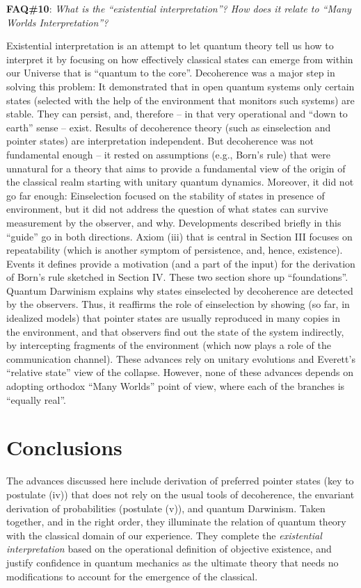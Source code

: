 \documentclass[aps,amsmath,amssymb,amsfonts,floatfix]{revtex4-1}
\newcommand{\+}         {\dagger}
\begin{document}
{{{{\bf FAQ\#10}: {\it What is the ``existential interpretation''? How does it relate to ``Many Worlds Interpretation''?}

Existential interpretation is an attempt to let quantum theory tell us how to interpret it by focusing on how effectively classical states can emerge from within our Universe that is ``quantum to the core''. Decoherence was a major step in solving this problem: It demonstrated that in open quantum systems only certain states (selected with the help of the environment that monitors such systems) are stable. They can persist, and, therefore -- in that very operational and ``down to earth'' sense -- exist. Results of decoherence theory (such as einselection and pointer states) are interpretation independent. But decoherence was not fundamental enough -- it rested on assumptions (e.g., Born's rule) that were unnatural for a theory that aims to provide a fundamental view of the origin of the classical realm starting with unitary quantum dynamics. Moreover, it did not go far enough: Einselection focused on the stability of states in presence of environment, but it did not address the question of what states can survive measurement by the observer, and why. Developments described briefly in this ``guide''  go in both directions. Axiom (iii) that is central in Section III focuses on repeatability (which is another symptom of persistence, and, hence, existence). Events it defines provide a motivation (and a part of the input) for the derivation of Born's rule sketched in Section IV. These two section shore up ``foundations''. Quantum Darwinism explains why states einselected by decoherence are detected by the observers. Thus, it reaffirms the role of einselection by showing (so far, in idealized models) that pointer states are usually reproduced in many copies in the environment, and that observers find out the state of the system indirectly, by intercepting fragments of the environment (which now plays a role of the communication channel). These advances rely on unitary evolutions and Everett's ``relative state'' view of the collapse. However, none of these advances depends on adopting orthodox ``Many Worlds'' point of view, where each of the branches is ``equally real''.

\section{Conclusions}

The advances discussed here include derivation of preferred pointer states (key to postulate (iv)) that does not rely on the usual tools of decoherence,
the envariant derivation of probabilities (postulate (v)), and quantum Darwinism. Taken together, and in the right order, they illuminate the relation
of quantum theory with the classical domain of our experience. They complete the
{\it existential interpretation} based on the operational definition of objective existence, and justify confidence in quantum mechanics as the ultimate theory that needs no modifications to account
for the emergence of the classical.

}}}
\end{document}
